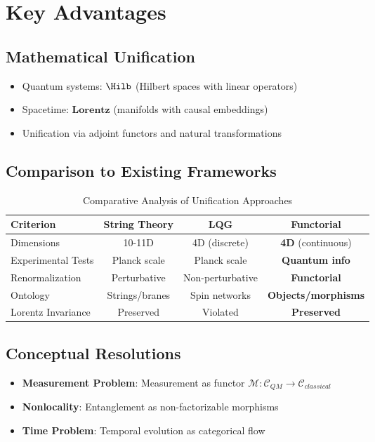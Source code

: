 \documentclass[11pt,a4paper]{article}
\begin{document}
\section{Key Advantages}

\subsection{Mathematical Unification}
\begin{itemize}
\item Quantum systems: $\Hilb$ (Hilbert spaces with linear operators)
\item Spacetime: $\mathbf{Lorentz}$ (manifolds with causal embeddings)
\item Unification via adjoint functors and natural transformations
\end{itemize}

\subsection{Comparison to Existing Frameworks}

\begin{table}[h]
\centering
\caption{Comparative Analysis of Unification Approaches}
\begin{tabular}{lccc}
\toprule
\textbf{Criterion} & \textbf{String Theory} & \textbf{LQG} & \textbf{Functorial} \\
\midrule
Dimensions & 10-11D & 4D (discrete) & \textbf{4D} (continuous) \\
Experimental Tests & Planck scale & Planck scale & \textbf{Quantum info} \\
Renormalization & Perturbative & Non-perturbative & \textbf{Functorial} \\
Ontology & Strings/branes & Spin networks & \textbf{Objects/morphisms} \\
Lorentz Invariance & Preserved & Violated & \textbf{Preserved} \\
\bottomrule
\end{tabular}
\end{table}

\subsection{Conceptual Resolutions}

\begin{itemize}
\item \textbf{Measurement Problem}: Measurement as functor $\mathcal{M}:\mathcal{C}_{QM}\to\mathcal{C}_{classical}$
\item \textbf{Nonlocality}: Entanglement as non-factorizable morphisms
\item \textbf{Time Problem}: Temporal evolution as categorical flow
\end{itemize}
\end{document}
